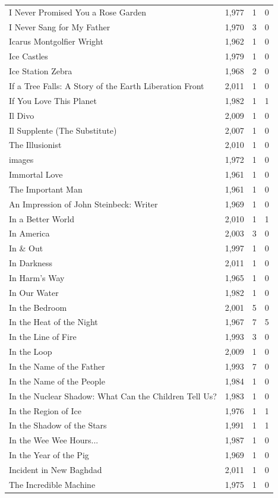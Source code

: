 \begin{tabular}{lrrr}
I Never Promised You a Rose Garden & 1,977 & 1 & 0 \\
I Never Sang for My Father & 1,970 & 3 & 0 \\
Icarus Montgolfier Wright & 1,962 & 1 & 0 \\
Ice Castles & 1,979 & 1 & 0 \\
Ice Station Zebra & 1,968 & 2 & 0 \\
If a Tree Falls: A Story of the Earth Liberation Front & 2,011 & 1 & 0 \\
If You Love This Planet & 1,982 & 1 & 1 \\
Il Divo & 2,009 & 1 & 0 \\
Il Supplente (The Substitute) & 2,007 & 1 & 0 \\
The Illusionist & 2,010 & 1 & 0 \\
images & 1,972 & 1 & 0 \\
Immortal Love & 1,961 & 1 & 0 \\
The Important Man & 1,961 & 1 & 0 \\
An Impression of John Steinbeck: Writer & 1,969 & 1 & 0 \\
In a Better World & 2,010 & 1 & 1 \\
In America & 2,003 & 3 & 0 \\
In \& Out & 1,997 & 1 & 0 \\
In Darkness & 2,011 & 1 & 0 \\
In Harm's Way & 1,965 & 1 & 0 \\
In Our Water & 1,982 & 1 & 0 \\
In the Bedroom & 2,001 & 5 & 0 \\
In the Heat of the Night & 1,967 & 7 & 5 \\
In the Line of Fire & 1,993 & 3 & 0 \\
In the Loop & 2,009 & 1 & 0 \\
In the Name of the Father & 1,993 & 7 & 0 \\
In the Name of the People & 1,984 & 1 & 0 \\
In the Nuclear Shadow: What Can the Children Tell Us? & 1,983 & 1 & 0 \\
In the Region of Ice & 1,976 & 1 & 1 \\
In the Shadow of the Stars & 1,991 & 1 & 1 \\
In the Wee Wee Hours... & 1,987 & 1 & 0 \\
In the Year of the Pig & 1,969 & 1 & 0 \\
Incident in New Baghdad & 2,011 & 1 & 0 \\
The Incredible Machine & 1,975 & 1 & 0 \\

\end{tabular}
